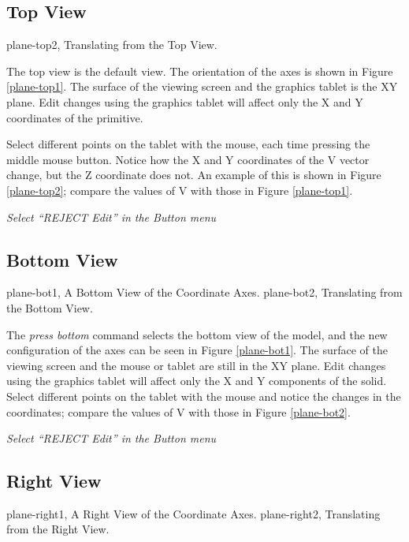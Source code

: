 \subsection{Top View}
\mfig plane-top2, Translating from the Top View.

The top view is the default view.  The orientation of the axes
is shown in Figure \ref{plane-top1}.
The surface of the viewing screen and the graphics tablet is the XY plane.
Edit changes using the graphics tablet will affect only the X and Y 
coordinates of the primitive.


Select different points on the tablet with the mouse, each time
pressing the middle mouse button.
Notice how the X and Y coordinates of the V vector change,
but the Z coordinate does not.
An example of this is shown in Figure \ref{plane-top2};
compare the values of V with those in Figure \ref{plane-top1}.

{\em Select ``REJECT Edit'' in the Button menu}

\subsection{Bottom View}
\mfig plane-bot1, A Bottom View of the Coordinate Axes.
\mfig plane-bot2, Translating from the Bottom View.


The {\em press bottom} command selects the bottom view of the
model, and the new configuration of the axes can be seen in
Figure \ref{plane-bot1}.
The surface of the viewing screen and the mouse or tablet
are still in the XY plane.
Edit changes using the graphics tablet will affect only the X and Y
components of the solid.
Select different points on the tablet with the mouse and notice the 
changes in the coordinates;
compare the values of V with those in Figure \ref{plane-bot2}.

{\em Select ``REJECT Edit'' in the Button menu}

\subsection{Right View}
\mfig plane-right1, A Right View of the Coordinate Axes.
\mfig plane-right2, Translating from the Right View.

